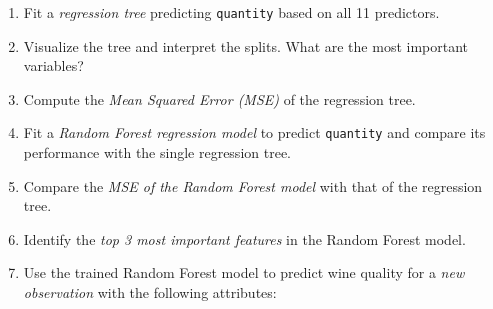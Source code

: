 \documentclass[
  11pt,
]{book}
\newcommand{\passthrough}[1]{#1}
\providecommand{\tightlist}{%
  \setlength{\itemsep}{0pt}\setlength{\parskip}{0pt}}
\theoremstyle{definition}
\theoremstyle{definition}
\theoremstyle{definition}
\theoremstyle{definition}
\theoremstyle{remark}
\begin{document}
\begin{enumerate}
\def\labelenumi{\arabic{enumi}.}
\setcounter{enumi}{40}
\tightlist
\item
  Fit a \emph{regression tree} predicting \passthrough{\lstinline!quantity!} based on all 11 predictors.\\
\item
  Visualize the tree and interpret the splits. What are the most important variables?\\
\item
  Compute the \emph{Mean Squared Error (MSE)} of the regression tree.\\
\item
  Fit a \emph{Random Forest regression model} to predict \passthrough{\lstinline!quantity!} and compare its performance with the single regression tree.\\
\item
  Compare the \emph{MSE of the Random Forest model} with that of the regression tree.\\
\item
  Identify the \emph{top 3 most important features} in the Random Forest model.\\
\item
  Use the trained Random Forest model to predict wine quality for a \emph{new observation} with the following attributes:


\end{enumerate}
\end{document}
